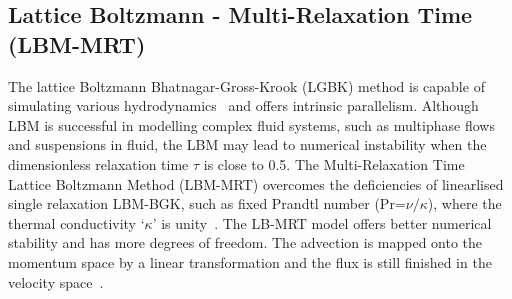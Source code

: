 \subsection{Lattice Boltzmann - Multi-Relaxation Time (LBM-MRT)}

The lattice Boltzmann Bhatnagar-Gross-Krook (LGBK) method is capable of 
simulating various hydrodynamics~\citep{Succi1989, Succi2001} and offers 
intrinsic parallelism. Although LBM is successful in modelling complex fluid 
systems, such as multiphase flows and suspensions in fluid, the LBM may lead to 
numerical instability when the dimensionless relaxation time $\tau$ is close to 
0.5. The Multi-Relaxation Time Lattice Boltzmann Method (LBM-MRT) overcomes the 
deficiencies of linearlised single relaxation LBM-BGK, such as fixed Prandtl 
number (Pr=$\nu/\kappa$), where the thermal conductivity `$\kappa$' is 
unity~\citep{Liu2003a}. The LB-MRT model offers better numerical stability and 
has more degrees of freedom. The advection is mapped onto the momentum space by 
a linear transformation and the flux is still finished in the velocity 
space~\citep{Du2006}.

